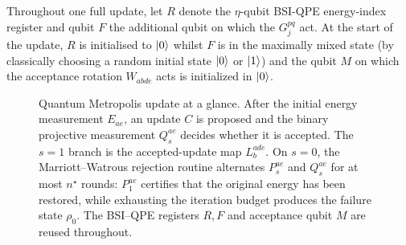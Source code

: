 \documentclass[aps,floatfix,10pt,amssymb,amsfont,amsmath,superscriptaddress,float,nofootinbib,longbibliography,nobalancelastpage,twocolumn]{revtex4-2}
\begin{document}
Throughout one full update, let $R$ denote the $\eta$-qubit BSI-QPE energy-index register and qubit $F$ the additional qubit on which the $G_j^{pq}$ act. At the start of the update, $R$ is initialised to $\ket{0}$ whilst $F$ is in the maximally mixed state (by classically choosing a random initial state $\ket{0}$ or $\ket{1}$) and the qubit $M$ on which the acceptance rotation $W_{abde}$ acts is initialized in $\ket{0}$. 
\begin{figure}[t]
  \centering
  
  \caption{Quantum Metropolis update at a glance.  After the initial energy
  measurement $E_{ae}$, an update $C$ is proposed and the binary projective
  measurement $Q^{ae}_{s}$ decides whether it is accepted.  The $s=1$ branch
  is the accepted-update map $L^{ade}_{b}$.  On $s=0$, the
  Marriott--Watrous rejection routine alternates $P^{ae}_{s}$ and
  $Q^{ae}_{s}$ for at most $n^{\star}$ rounds: $P^{ae}_{1}$ certifies that the
  original energy has been restored, while exhausting the iteration budget
  produces the failure state $\rho_{0}$.  The BSI--QPE registers $R,F$ and
  acceptance qubit $M$ are reused throughout.}
  \label{fig:quantum-metropolis-flowchart}
\end{figure}

\end{document}
